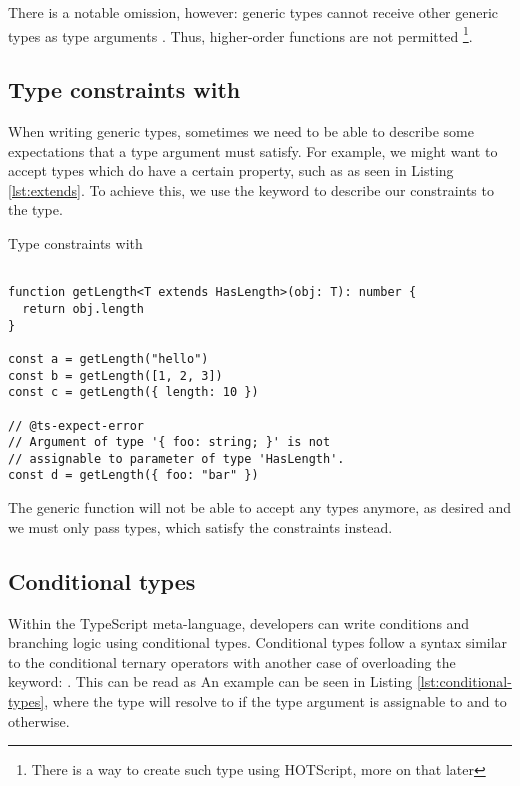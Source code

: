There is a notable omission, however: generic types cannot receive other generic types as type arguments \cite{TypeInferenceHigherorder}. Thus, higher-order functions are not permitted \footnote{There is a way to create such type using HOTScript, more on that later}.

\subsection{Type constraints with }

When writing generic types, sometimes we need to be able to describe some expectations that a type argument must satisfy. For example, we might want to accept types which do have a certain property, such as  as seen in Listing \ref{lst:extends}. To achieve this, we use the  keyword to describe our constraints to the type.

\begin{listing}[ht]
  \caption{Type constraints with }\label{lst:extends}
  \begin{verbatim}

function getLength<T extends HasLength>(obj: T): number {
  return obj.length
}

const a = getLength("hello")
const b = getLength([1, 2, 3])
const c = getLength({ length: 10 })

// @ts-expect-error 
// Argument of type '{ foo: string; }' is not 
// assignable to parameter of type 'HasLength'.
const d = getLength({ foo: "bar" })
\end{verbatim}
\end{listing}

The generic function will not be able to accept any types anymore, as desired and we must only pass types, which satisfy the constraints instead.

\subsection{Conditional types}

Within the TypeScript meta-language, developers can write conditions and branching logic using conditional types. Conditional types follow a syntax similar to the conditional ternary operators with another case of overloading the  keyword: . This can be read as  An example can be seen in Listing \ref{lst:conditional-types}, where the  type will resolve to  if the type argument  is assignable to  and to  otherwise.

